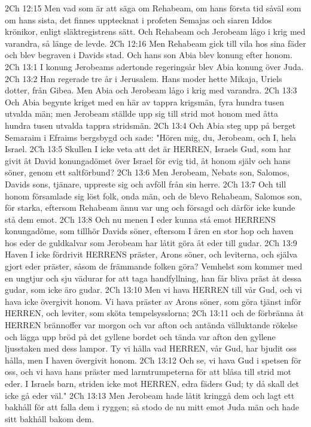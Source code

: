 2Ch 12:15  Men vad som är att säga om Rehabeam, om hans första tid såväl som om hans sista, det finnes upptecknat i profeten Semajas och siaren Iddos krönikor, enligt släktregistrens sätt. Och Rehabeam och Jerobeam lågo i krig med varandra, så länge de levde.
2Ch 12:16  Men Rehabeam gick till vila hos sina fäder och blev begraven i Davids stad. Och hans son Abia blev konung efter honom.
2Ch 13:1  I konung Jerobeams adertonde regeringsår blev Abia konung över Juda.
2Ch 13:2  Han regerade tre år i Jerusalem. Hans moder hette Mikaja, Uriels dotter, från Gibea. Men Abia och Jerobeam lågo i krig med varandra.
2Ch 13:3  Och Abia begynte kriget med en här av tappra krigsmän, fyra hundra tusen utvalda män; men Jerobeam ställde upp sig till strid mot honom med åtta hundra tusen utvalda tappra stridsmän.
2Ch 13:4  Och Abia steg upp på berget Semaraim i Efraims bergsbygd och sade: "Hören mig, du, Jerobeam, och I, hela Israel.
2Ch 13:5  Skullen I icke veta att det är HERREN, Israels Gud, som har givit åt David konungadömet över Israel för evig tid, åt honom själv och hans söner, genom ett saltförbund?
2Ch 13:6  Men Jerobeam, Nebats son, Salomos, Davids sons, tjänare, uppreste sig och avföll från sin herre.
2Ch 13:7  Och till honom församlade sig löst folk, onda män, och de blevo Rehabeam, Salomos son, för starka, eftersom Rehabeam ännu var ung och försagd och därför icke kunde stå dem emot.
2Ch 13:8  Och nu menen I eder kunna stå emot HERRENS konungadöme, som tillhör Davids söner, eftersom I ären en stor hop och haven hos eder de guldkalvar som Jerobeam har låtit göra åt eder till gudar.
2Ch 13:9  Haven I icke fördrivit HERRENS präster, Arons söner, och leviterna, och själva gjort eder präster, såsom de främmande folken göra? Vemhelst som kommer med en ungtjur och sju vädurar for att taga handfyllning, han får bliva präst åt dessa gudar, som icke äro gudar.
2Ch 13:10  Men vi hava HERREN till vår Gud, och vi hava icke övergivit honom. Vi hava präster av Arons söner, som göra tjänst inför HERREN, och leviter, som sköta tempelsysslorna;
2Ch 13:11  och de förbränna åt HERREN brännoffer var morgon och var afton och antända välluktande rökelse och lägga upp bröd på det gyllene bordet och tända var afton den gyllene ljusstaken med dess lampor. Ty vi hålla vad HERREN, vår Gud, har bjudit oss hålla, men I haven övergivit honom.
2Ch 13:12  Och se, vi hava Gud i spetsen för oss, och vi hava hans präster med larmtrumpeterna för att blåsa till strid mot eder. I Israels barn, striden icke mot HERREN, edra fäders Gud; ty då skall det icke gå eder väl."
2Ch 13:13  Men Jerobeam hade låtit kringgå dem och lagt ett bakhåll för att falla dem i ryggen; så stodo de nu mitt emot Juda män och hade sitt bakhåll bakom dem.
